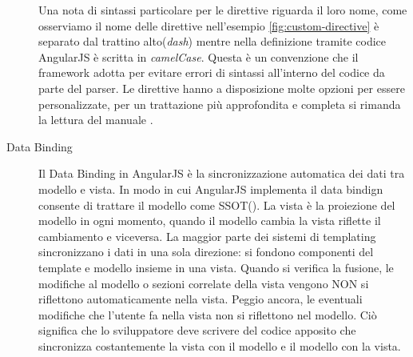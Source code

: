 \begin{description}
Una nota di sintassi particolare per le direttive riguarda il loro nome, come osserviamo il nome delle direttive nell'esempio \ref{fig:custom-directive} è separato dal trattino alto(\emph{dash}) mentre nella definizione tramite codice AngularJS è scritta in \emph{camelCase}. Questa è un convenzione che il framework adotta per evitare errori di sintassi all'interno del codice da parte del parser. Le direttive hanno a disposizione molte opzioni per essere personalizzate, per un trattazione più approfondita e completa si rimanda la lettura del manuale \cite{angularjs:directives}.

\item[Data Binding] Il Data Binding in AngularJS è la sincronizzazione automatica dei dati tra modello e vista. In modo in cui AngularJS implementa il data bindign consente di trattare il modello come SSOT(\cite{wiki:SSOT}). La vista è la proiezione del modello in ogni momento, quando il modello cambia la vista riflette il cambiamento e viceversa. 
La maggior parte dei sistemi di templating sincronizzano i dati in una sola direzione: si fondono componenti del template e modello insieme in una vista. Quando si verifica la fusione, le modifiche al modello o sezioni correlate della vista vengono NON si riflettono automaticamente nella vista. Peggio ancora, le eventuali modifiche che l'utente fa nella vista non si riflettono nel modello. Ciò significa che lo sviluppatore deve scrivere del codice apposito che sincronizza costantemente la vista con il modello e il modello con la vista.


\end{description}
